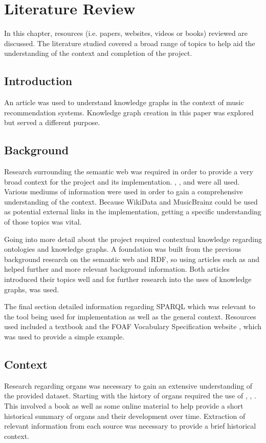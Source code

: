 \chapter{Literature Review}
In this chapter, resources (i.e. papers, websites, videos or books) reviewed are discussed. The literature studied covered a broad range of topics to help aid the understanding of the context and completion of the project.

\section{Introduction}
\hspace{0.5cm} An article \cite{oramas2016sound} was used to understand knowledge graphs in the context of music recommendation systems. Knowledge graph creation in this paper was explored but served a different purpose.

\section{Background}
\hspace{0.5cm} Research surrounding the semantic web was required in order to provide a very broad context for the project and its implementation. \cite{berners-TBLBook}, \cite{semanticweb}, \cite{rdf} and \cite{TTL} were all used. Various mediums of information were used in order to gain a comprehensive understanding of the context. Because WikiData \cite{wikidata} and MusicBrainz \cite{musicbrainz} could be used as potential external links in the implementation, getting a specific understanding of those topics was vital. 

Going into more detail about the project required contextual knowledge regarding ontologies and knowledge graphs. A foundation was built from the previous background research on the semantic web and RDF, so using articles such as \cite{ontology} and \cite{knowledgegraph} helped further and more relevant background information. Both articles introduced their topics well and for further research into the uses of knowledge graphs, \cite{searchengine} was used.   

The final section detailed information regarding SPARQL which was relevant to the tool being used for implementation as well as the general context. Resources used included a textbook\cite{sparlbook} and the FOAF Vocabulary Specification website \cite{foaf}, which was used to provide a simple example. 

\section{Context}
\hspace{0.5cm} Research regarding organs was necessary to gain an extensive understanding of the provided dataset. Starting with the history of organs required the use of \cite{organhistory}, \cite{organhistory1}, \cite{organmedivalhistory}. This involved a book as well as some online material to help provide a short historical summary of organs and their development over time. Extraction of relevant information from each source was necessary to provide a brief historical context. 

